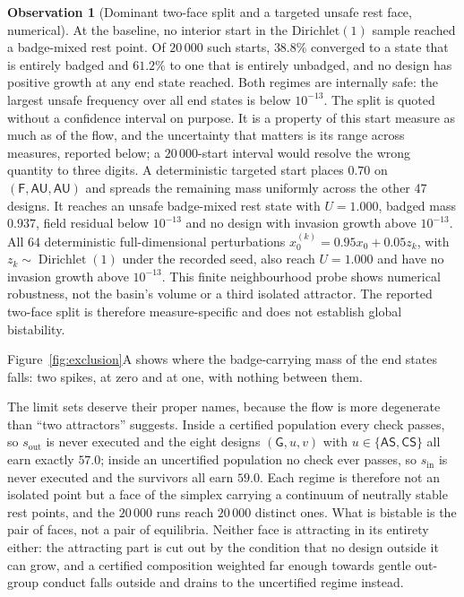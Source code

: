 \documentclass[preprint,12pt]{elsarticle}
\theoremstyle{plain}
\theoremstyle{definition}
\newtheorem{observation}[theorem]{Observation}
\newcommand{\AS}{\textsf{AS}}
\newcommand{\CS}{\textsf{CS}}
\newcommand{\AU}{\textsf{AU}}
\begin{document}
\begin{observation}[Dominant two-face split and a targeted unsafe rest face, numerical]
\label{prop:bistable}
At the baseline, no interior start in the $\mathrm{Dirichlet}(1)$ sample
reached a badge-mixed rest point. Of $20\,000$ such starts, $38.8\%$ converged
to a state that is entirely badged and $61.2\%$ to one that is entirely
unbadged, and no design has positive growth at any end state reached. Both
regimes are internally safe: the largest unsafe frequency over all end states
is below $10^{-13}$. The split is quoted without a confidence interval on
purpose. It is a property of this start measure as much as of the flow, and the
uncertainty that matters is its range across measures, reported below; a
$20\,000$-start interval would resolve the wrong quantity to three digits.
A deterministic targeted start places $0.70$ on $(\mathsf{F},\AU,\AU)$ and
spreads the remaining mass uniformly across the other 47 designs. It reaches
an unsafe badge-mixed rest state with $U=1.000$, badged mass $0.937$, field
residual below $10^{-13}$ and no design with invasion growth above $10^{-13}$.
All $64$ deterministic full-dimensional perturbations
$x_0^{(k)}=0.95x_0+0.05z_k$, with $z_k\sim\operatorname{Dirichlet}(1)$ under
the recorded seed, also reach $U=1.000$ and have no invasion growth above
$10^{-13}$. This finite neighbourhood probe shows numerical robustness, not
the basin's volume or a third isolated attractor. The reported two-face split
is therefore measure-specific and does not establish global bistability.
\end{observation}

Figure~\ref{fig:exclusion}A shows where the badge-carrying mass of the end
states falls: two spikes, at zero and at one, with nothing between them.

The limit sets deserve their proper names, because the flow is more degenerate
than ``two attractors'' suggests. Inside a certified population every check
passes, so $s_{\mathrm{out}}$ is never executed and the eight designs
$(\mathsf{G}, u, v)$ with $u \in \{\AS, \CS\}$ all earn exactly $57.0$; inside
an uncertified population no check ever passes, so $s_{\mathrm{in}}$ is never
executed and the survivors all earn $59.0$. Each regime is therefore not an
isolated point but a face of the simplex carrying a continuum of neutrally
stable rest points, and the $20\,000$ runs reach $20\,000$ distinct ones. What
is bistable is the pair of faces, not a pair of equilibria. Neither face is
attracting in its entirety either: the attracting part is cut out by the
condition that no design outside it can grow, and a certified composition
weighted far enough towards gentle out-group conduct falls outside and drains
to the uncertified regime instead.
\end{document}
